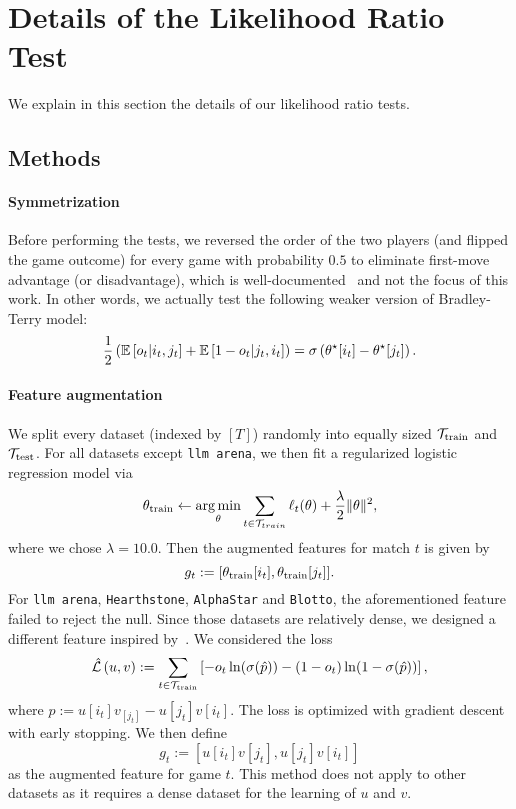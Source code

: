 \section{Details of the Likelihood Ratio Test}
\label{sec:lr-test}
We explain in this section the details of our likelihood ratio tests.




\subsection{Methods}
\paragraph{Symmetrization} Before performing the tests, we reversed the order of the two players (and flipped the game outcome) for every game with probability $0.5$ to eliminate first-move advantage (or disadvantage), which is well-documented~\citep{elo1978rating} and not the focus of this work. In other words, we actually test the following weaker version of Bradley-Terry model:
\[
\frac{1}{2}\left(\mathbb{E}\left[o_t|i_t,j_t\right]+ \mathbb{E}\left[1-o_t|j_t,i_t\right]\right) = \sigma\left(\theta^\star[i_t] -\theta^\star[j_t]\right).
\]
\paragraph{Feature augmentation} We split every dataset (indexed by $[T]$) randomly into equally sized $\mathcal{T}_{\rm train}$ and $\mathcal{T}_{\rm test}$. For all datasets except \texttt{llm arena}, we then fit a regularized logistic regression model via
\[
\theta_{\rm train}\gets \operatorname*{arg\,min}_\theta \sum_{t\in \mathcal{T}_{train}}\ell_t(\theta) + \frac{\lambda}{2}\Vert\theta\Vert^2,
\]
where we chose $\lambda=10.0$. Then the augmented features for match $t$ is given by
\[
g_t:=[\theta_{\rm train}[i_t], \theta_{\rm train}[j_t]].
\]
For \texttt{llm arena}, \texttt{Hearthstone}, \texttt{AlphaStar} and \texttt{Blotto}, the aforementioned feature failed to reject the null. Since those datasets are relatively dense, we designed a different feature inspired by~\citep{bertrand2023limitations}. We considered the loss
\begin{align*}
\hat{\mathcal{L}}\left(u, v\right):=\sum_{t\in\mathcal{T}_{\rm train}} \left[-o_t\ln(\sigma(\hat p)) - (1-o_t)\ln(1-\sigma(\hat p))\right],
\end{align*}
where $\hat p:=u[i_t]v_[j_t]-u[j_t]v[i_t]$. The loss is optimized with gradient descent with early stopping. We then define
\[
g_t:=[u[i_t]v[j_t], u[j_t]v[i_t]]
\]
as the augmented feature for game $t$. This method does not apply to other datasets as it requires a dense dataset for the learning of $u$ and $v$.

